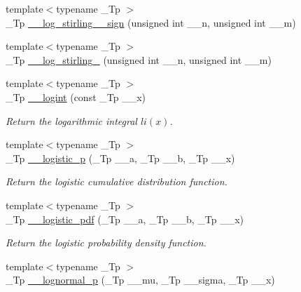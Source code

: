 \begin{DoxyCompactItemize}
\item 
{\footnotesize template$<$typename \+\_\+\+Tp $>$ }\\\+\_\+\+Tp \hyperlink{namespacestd_1_1____detail_af804ed0eecfca835d1338a48892460b0}{\+\_\+\+\_\+log\+\_\+stirling\+\_\+\_\+sign} (unsigned int \+\_\+\+\_\+n, unsigned int \+\_\+\+\_\+m)
\item 
{\footnotesize template$<$typename \+\_\+\+Tp $>$ }\\\+\_\+\+Tp \hyperlink{namespacestd_1_1____detail_a7ba1fde0547236676d579b6405f2fb25}{\+\_\+\+\_\+log\+\_\+stirling\+\_} (unsigned int \+\_\+\+\_\+n, unsigned int \+\_\+\+\_\+m)
\item 
{\footnotesize template$<$typename \+\_\+\+Tp $>$ }\\\+\_\+\+Tp \hyperlink{namespacestd_1_1____detail_a4d5f8cb2b4e6e192faba9418ec14149f}{\+\_\+\+\_\+logint} (const \+\_\+\+Tp \+\_\+\+\_\+x)
\begin{DoxyCompactList}\small\item\em Return the logarithmic integral $ li(x) $. \end{DoxyCompactList}\item 
{\footnotesize template$<$typename \+\_\+\+Tp $>$ }\\\+\_\+\+Tp \hyperlink{namespacestd_1_1____detail_a2ee185d74e39b87c74c3c428f8e73ee7}{\+\_\+\+\_\+logistic\+\_\+p} (\+\_\+\+Tp \+\_\+\+\_\+a, \+\_\+\+Tp \+\_\+\+\_\+b, \+\_\+\+Tp \+\_\+\+\_\+x)
\begin{DoxyCompactList}\small\item\em Return the logistic cumulative distribution function. \end{DoxyCompactList}\item 
{\footnotesize template$<$typename \+\_\+\+Tp $>$ }\\\+\_\+\+Tp \hyperlink{namespacestd_1_1____detail_a4c845b9f17fc3e35dccc0954d82d62f9}{\+\_\+\+\_\+logistic\+\_\+pdf} (\+\_\+\+Tp \+\_\+\+\_\+a, \+\_\+\+Tp \+\_\+\+\_\+b, \+\_\+\+Tp \+\_\+\+\_\+x)
\begin{DoxyCompactList}\small\item\em Return the logistic probability density function. \end{DoxyCompactList}\item 
{\footnotesize template$<$typename \+\_\+\+Tp $>$ }\\\+\_\+\+Tp \hyperlink{namespacestd_1_1____detail_a332aebbc96ef310620918cb6becb9760}{\+\_\+\+\_\+lognormal\+\_\+p} (\+\_\+\+Tp \+\_\+\+\_\+mu, \+\_\+\+Tp \+\_\+\+\_\+sigma, \+\_\+\+Tp \+\_\+\+\_\+x)

\end{DoxyCompactItemize}
